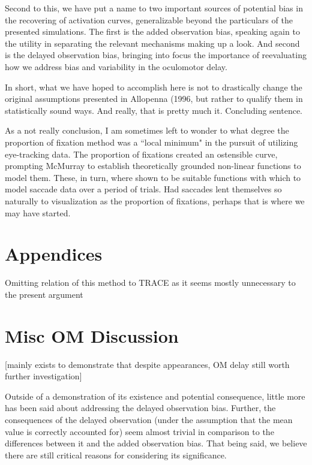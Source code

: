 Second to this, we have put a name to two important sources of potential bias in the recovering of activation curves, generalizable beyond the particulars of the presented simulations. The first is the added observation bias, speaking again to the utility in separating the relevant mechanisms making up a look. And second is the delayed observation bias, bringing into focus the importance of reevaluating how we address bias and variability in the oculomotor delay.


In short, what we have hoped to accomplish here is not to drastically change the original assumptions presented in Allopenna (1996, but rather to qualify them in statistically sound ways. And really, that is pretty much it. Concluding sentence.


As a not really conclusion, I am sometimes left to wonder to what degree the proportion of fixation method was a  ``local minimum" in the pursuit of utilizing eye-tracking data. The proportion of fixations created an ostensible curve, prompting McMurray to establish theoretically grounded non-linear functions to model them. These, in turn, where shown to be suitable functions with which to model saccade data over a period of trials. Had saccades lent themselves so naturally to visualization as the proportion of fixations, perhaps that is where we may have started.


\section*{Appendices}

Omitting relation of this method to TRACE as it seems mostly unnecessary to the present argument 

\section{Misc OM Discussion}

[mainly exists to demonstrate that despite appearances, OM delay still worth further investigation]

Outside of a demonstration of its existence and potential consequence, little more has been said about addressing the delayed observation bias. Further, the consequences of the delayed observation (under the assumption that the mean value is correctly accounted for) seem almost trivial in comparison to the differences between it and the added observation bias. That being said, we believe there are still critical reasons for considering its significance.

